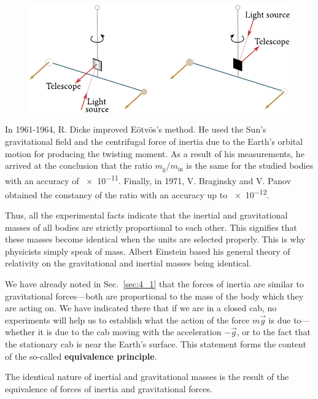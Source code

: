 \begin{figure}[t]
	\begin{center}
		\includegraphics[scale=0.95]{figures/ch_06/fig_6_7.pdf}
		\caption[]{}
		\label{fig:6_7}
	\end{center}
	\vspace{-0.7cm}
\end{figure}

In 1961-1964, R. Dicke improved E\"{o}tv\"{o}s's method. He used the Sun's gravitational field and the centrifugal force of inertia due to the Earth's orbital motion for producing the twisting moment. As a result of his measurements, he arrived at the conclusion that the ratio $m_{\text{g}}/m_{\text{in}}$ is the same for the studied bodies with an accuracy of \num{e-11}. Finally, in 1971, V. Braginsky and V. Panov obtained the constancy of the ratio with an accuracy up to \num{e-12}.

Thus, all the experimental facts indicate that the inertial and gravitational masses of all bodies are strictly proportional to each other. This signifies that these masses become identical when the units are selected properly. This is why physicists simply speak of mass. Albert Einstein based his general theory of relativity on the gravitational and inertial masses being identical.

We have already noted in Sec.~\ref{sec:4_1} that the forces of inertia are similar to gravitational forces---both are proportional to the mass of the body which they are acting on. We have indicated there that if we are in a closed cab, no experiments will help us to establish what the action of the force $m\vec{g}$ is due to---whether it is due to the cab moving with the acceleration $-\vec{g}$, or to the fact that the stationary cab is near the Earth's surface. This statement forms the content of the so-called \textbf{equivalence principle}.

The identical nature of inertial and gravitational masses is the result of the equivalence of forces of inertia and gravitational forces.

